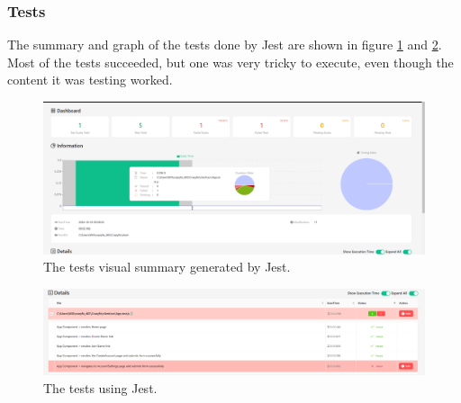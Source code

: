 \documentclass{article}
\begin{document}
\subsubsection{Tests}
The summary and graph of the tests done by Jest are shown in figure \ref{fig:test1} and \ref{fig:test2}. Most of the tests succeeded, but one was very tricky to execute, even though the content it was testing worked.

\begin{figure}[h]
\centering
\includegraphics[width=\linewidth]{tests1.png}
\caption{\label{fig:test1}The tests visual summary generated by Jest.}
\end{figure}

\begin{figure}[h]
\centering
\includegraphics[width=\linewidth]{tests2.png}
\caption{\label{fig:test2}The tests using Jest.}
\end{figure}
\end{document}
